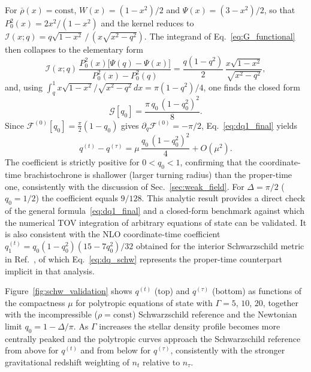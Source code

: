 \documentclass[
  aps,
  prd,
  twocolumn,
  nofootinbib,
  superscriptaddress,
  longbibliography
]{revtex4-2}
\begin{document}
For $\bar\rho(x)=\mathrm{const}$, $W(x)=(1-x^2)/2$ and
$\Psi(x)=(3-x^2)/2$, so that $P_0^2(x)=2x^2/(1-x^2)$ and the kernel
reduces to $\mathcal{I}(x;q)=q\sqrt{1-x^2}\,/\,(x\sqrt{x^2-q^2})$. The
integrand of Eq.~\eqref{eq:G_functional} then collapses to the
elementary form
\begin{equation}
\mathcal{I}(x;q)\,
\frac{P_0^2(x)\bigl[\Psi(q)-\Psi(x)\bigr]}{P_0^2(x)-P_0^2(q)}
=
\frac{q(1-q^2)}{2}\,
\frac{x\sqrt{1-x^2}}{\sqrt{x^2-q^2}},
\label{eq:integrand_schw}
\end{equation}
and, using $\int_{q}^{1}x\sqrt{1-x^2}/\sqrt{x^2-q^2}\,dx=
\pi(1-q^2)/4$, one finds the closed form
\begin{equation}
\mathcal{G}[q_0]=\frac{\pi\,q_0\,(1-q_0^2)^2}{8}.
\label{eq:G_schw}
\end{equation}
Since $\mathcal{F}^{(0)}[q_0]=\tfrac{\pi}{2}(1-q_0)$ gives
$\partial_q\mathcal{F}^{(0)}=-\pi/2$, Eq.~\eqref{eq:dq1_final} yields
\begin{equation}
q^{(t)}-q^{(\tau)}
=
\mu\,\frac{q_0\,(1-q_0^2)^2}{4}
+O(\mu^2).
\label{eq:dq_schw}
\end{equation}
The coefficient is strictly positive for $0<q_0<1$, confirming that the
coordinate-time brachistochrone is shallower (larger turning radius)
than the proper-time one, consistently with the discussion of
Sec.~\ref{sec:weak_field}. For $\Delta=\pi/2$ ($q_0=1/2$) the
coefficient equals $9/128$. This analytic result provides a direct
check of the general formula~\eqref{eq:dq1_final} and a closed-form
benchmark against which the numerical TOV integration of arbitrary
equations of state can be validated. It is also consistent with the
NLO coordinate-time coefficient
$q_1^{(t)}=q_0(1-q_0^2)(15-7q_0^2)/32$ obtained for the interior
Schwarzschild metric in Ref.~\cite{Rosignoli2026}, of which
Eq.~\eqref{eq:dq_schw} represents the proper-time counterpart implicit
in that analysis.

Figure~\ref{fig:schw_validation} shows $q^{(t)}$ (top) and $q^{(\tau)}$ (bottom) as functions of the compactness $\mu$ for polytropic equations of state with $\Gamma=5$, $10$, $20$, together with the incompressible ($\rho=\mathrm{const}$) Schwarzschild reference and the Newtonian limit $q_0=1-\Delta/\pi$.
As $\Gamma$ increases the stellar density profile becomes more centrally peaked and the polytropic curves approach the Schwarzschild reference from above for $q^{(t)}$ and from below for $q^{(\tau)}$, consistently with the stronger gravitational redshift weighting of $n_t$ relative to $n_\tau$.
\end{document}
